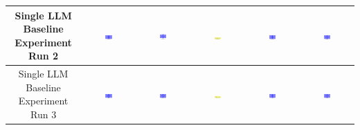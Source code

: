 \begin{table}[H]
\begin{tabular}{|c|c|c|c|c|c|}
    \hline
    Single LLM Baseline Experiment Run 2 & \includegraphics[width=0.15\textwidth]{./run_2/png/gpt-4o_results/BasicLayout.png} & \includegraphics[width=0.15\textwidth]{./run_2/png/claude-3-5-sonnet-20240620_results/BasicLayout.png} & \includegraphics[width=0.15\textwidth]{./run_2/png/watsonx_meta-llama_llama-3-1-70b-instruct_results/BasicLayout.png} & \includegraphics[width=0.15\textwidth]{./run_2/png/watsonx_meta-llama_llama-3-405b-instruct_results/BasicLayout.png} & \includegraphics[width=0.15\textwidth]{./run_2/png/o1-preview_results/BasicLayout.png} \\
    \hline
    Single LLM Baseline Experiment Run 3 & \includegraphics[width=0.15\textwidth]{./run_3/png/gpt-4o_results/BasicLayout.png} & \includegraphics[width=0.15\textwidth]{./run_3/png/claude-3-5-sonnet-20240620_results/BasicLayout.png} & \includegraphics[width=0.15\textwidth]{./run_3/png/watsonx_meta-llama_llama-3-1-70b-instruct_results/BasicLayout.png} & \includegraphics[width=0.15\textwidth]{./run_3/png/watsonx_meta-llama_llama-3-405b-instruct_results/BasicLayout.png} & \includegraphics[width=0.15\textwidth]{./run_3/png/o1-preview_results/BasicLayout.png} \\

\end{tabular}
\end{table}
